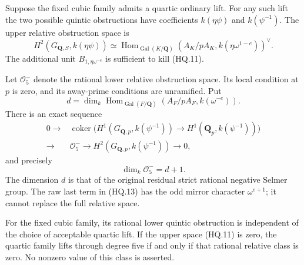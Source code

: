 \begin{theorem}
Suppose the fixed cubic family admits a quartic ordinary lift.
For any such lift the two possible quintic obstructions have
coefficients \(k(\eta\psi)\) and \(k(\psi^{-1})\).
The upper relative obstruction space is
\[
 H^2(G_{\mathbf Q,S},k(\eta\psi))
 \simeq\operatorname{Hom}_{\operatorname{Gal}(K/\mathbf Q)}
       (A_K/pA_K,k(\eta\omega^{1-e}))^\vee.
                                                        \tag{HQ.11}
\]
The additional unit \(B_{1,\eta\omega^{-e}}\) is
sufficient to kill (HQ.11).

Let \(\mathcal O^-_5\) denote the rational lower
relative obstruction space.  Its local condition at
\(p\) is zero, and its away-prime conditions are
unramified.  Put
\[
 d=\dim_k\operatorname{Hom}_{\operatorname{Gal}(F/\mathbf Q)}
                       (A_F/pA_F,k(\omega^{-e})).
                                                        \tag{HQ.12}
\]
There is an exact sequence
\[
\begin{split}
0\longrightarrow&
 \operatorname{coker}\bigl(H^1(G_{\mathbf Q,p},k(\psi^{-1}))
                  \to H^1(\mathbf Q_p,k(\psi^{-1}))\bigr)\\
\longrightarrow&\mathcal O^-_5
\longrightarrow H^2(G_{\mathbf Q,p},k(\psi^{-1}))
\longrightarrow0,
\end{split}                                               \tag{HQ.13}
\]
and precisely
\[
                         \dim_k\mathcal O^-_5=d+1.
                                                        \tag{HQ.14}
\]
The dimension \(d\) is that of the original residual
strict rational negative Selmer group.  The raw last
term in (HQ.13) has the odd mirror character
\(\omega^{e+1}\); it cannot replace the full relative
space.

For the fixed cubic family, its rational lower
quintic obstruction is independent of the choice
of acceptable quartic lift.  If the upper space
(HQ.11) is zero, the quartic family lifts through
degree five if and only if that rational relative
class is zero.  No nonzero value of this class is
asserted.
\end{theorem}

